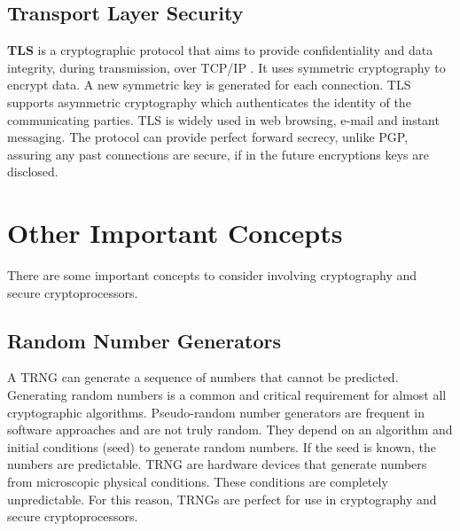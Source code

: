 \subsection{Transport Layer Security}\label{chap:background:TLS}

\textbf{\ac{TLS}} is a cryptographic protocol that aims to provide confidentiality and data integrity, during transmission, over TCP/IP \cite{rescorla2018transport}. It uses symmetric cryptography to encrypt data. A new symmetric key is generated for each connection.
\ac{TLS} supports asymmetric cryptography which authenticates the identity of the communicating parties.
\ac{TLS} is widely used in web browsing, e-mail and instant messaging.
The protocol can provide perfect forward secrecy, unlike \ac{PGP}, assuring any past connections are secure, if in the future encryptions keys are disclosed.



\section{Other Important Concepts}\label{chap:background:other}

There are some important concepts to consider involving cryptography and secure cryptoprocessors.

\subsection{Random Number Generators}
A \ac{TRNG} can generate a sequence of numbers that cannot be predicted. Generating random numbers is a common and critical requirement for almost all cryptographic algorithms. Pseudo-random number generators are frequent in software approaches and are not truly random. They depend on an algorithm and initial conditions (seed) to generate random numbers. If the seed is known, the numbers are predictable.
\ac{TRNG} are hardware devices that generate numbers from microscopic physical conditions. These conditions are completely unpredictable. For this reason, \ac{TRNG}s are perfect for use in cryptography and secure cryptoprocessors.

